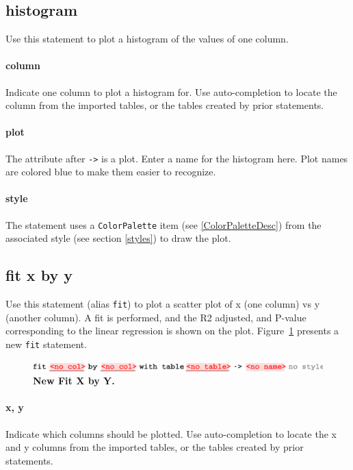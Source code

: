 \subsection{histogram}
Use this statement to plot a histogram of the values of one column.
\paragraph{column}
Indicate one column to plot a histogram for. Use auto-completion to locate the column from the imported tables, or the tables created by prior statements. 

\paragraph{plot}
The attribute after \texttt{->} is a plot. Enter a name for the histogram here. Plot names are colored blue to make them easier to recognize.

\paragraph{style}
The statement uses a \texttt{Color\allowbreak{}Palette} item (see \ref{ColorPaletteDesc}) from the associated style (see section \ref{styles}) to draw the plot. 

\subsection{fit x by y}
Use this statement (alias \texttt{fit}) to plot a scatter plot of x (one column) vs y (another column). A fit is performed, and the R2 adjusted, and P-value corresponding to the linear regression is shown on the plot. Figure~\ref{fig:NewFitXByY} presents a new \texttt{fit} statement.

\begin{figure}[h!tbp]
  \centering
  \includegraphics[width=\figWidthWide]{figures/NewFitXByY.pdf}
\caption[New Fit X by Y.]{\textbf{New Fit X by Y.}}
\label{fig:NewFitXByY}
\end{figure}

\paragraph{x, y}
Indicate which columns should be plotted. Use auto-completion to locate the x and y columns from the imported tables, or the tables created by prior statements. 

